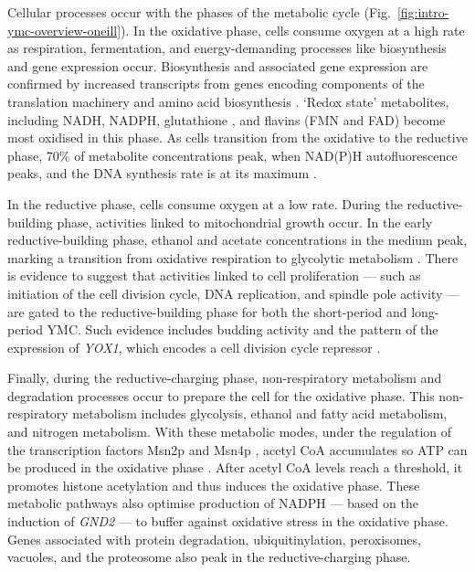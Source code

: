 Cellular processes occur with the phases of the metabolic cycle (Fig.\ \ref{fig:intro-ymc-overview-oneill}).
In the oxidative phase, cells consume oxygen at a high rate as respiration, fermentation, and
energy-demanding processes
like biosynthesis and gene expression occur.
Biosynthesis and associated gene expression are confirmed by increased transcripts from genes encoding components of the translation machinery and amino acid biosynthesis \parencite{tuLogicYeastMetabolic2005}.
`Redox state' metabolites, including NADH, NADPH, glutathione \parencite{lloydUltradianMetronomeTimekeeper2005}, and flavins (FMN and FAD)
\parencite{murrayRedoxRegulationRespiring2011} become most oxidised in this phase.
As cells transition from the oxidative to the reductive phase, 70\% of metabolite concentrations peak, when NAD(P)H autofluorescence peaks, and the DNA synthesis rate is at its maximum \parencite{lloydTemporalArchitectureEukaryotic2006}.

In the reductive phase, cells consume oxygen at a low rate.
During the reductive-building phase, activities linked to mitochondrial growth occur.
In the early reductive-building phase, ethanol and acetate concentrations in the medium peak, marking a transition from oxidative respiration to glycolytic metabolism \parencite{tuCyclicChangesMetabolic2007}.
There is evidence to suggest that activities linked to cell proliferation --- such as initiation of the cell division cycle, DNA replication, and spindle pole activity --- are gated to the reductive-building phase for both the short-period and long-period YMC\@.
Such evidence includes budding activity and the pattern of the expression of \textit{YOX1}, which encodes a cell division cycle repressor \parencite{tuLogicYeastMetabolic2005}.

Finally, during the reductive-charging phase,
non-respiratory metabolism and degradation processes occur to prepare the cell for the oxidative phase.
This non-respiratory metabolism includes glycolysis, ethanol and fatty acid metabolism, and nitrogen metabolism.
With these metabolic modes, under the regulation of the transcription factors Msn2p and Msn4p \parencite{kuangMsn2RegulateExpression2017}, acetyl CoA accumulates so ATP can be produced in the oxidative phase \parencite{tuLogicYeastMetabolic2005}.
After acetyl CoA levels reach a threshold, it promotes histone acetylation and thus induces the oxidative phase.
These metabolic pathways also optimise production of NADPH --- based on the induction of \textit{GND2} --- to buffer against oxidative stress in the oxidative phase.
Genes associated with protein degradation, ubiquitinylation, peroxisomes, vacuoles, and the proteosome also peak in the reductive-charging phase.

